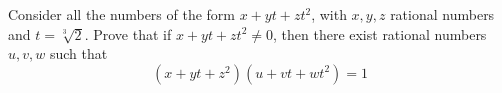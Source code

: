 Consider all the numbers of the form $x+yt+zt^2$,  with $x,y,z$ rational numbers and $t=\sqrt[3]{2}$. Prove that if $x+yt+zt^2\not= 0$,  then there exist rational numbers $u,v,w$ such that\[(x+yt+z^2)(u+vt+wt^2)=1\]